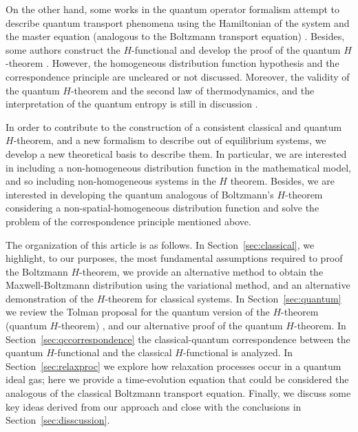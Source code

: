 On the other hand, some works in the quantum operator formalism attempt to
describe quantum transport phenomena using the Hamiltonian of the system and
the master equation (analogous to the Boltzmann transport equation)
\cite{bib:gorban2014,bib:bennaim2017,bib:tolman,bib:li2019}. %
Besides, some authors construct the $H$-functional and develop the proof of the
quantum $H$-theorem \cite{bib:silva2010,bib:deroeck2006,bib:grabert1974}.
However, the homogeneous distribution function hypothesis and the
correspondence principle are uncleared or not discussed. Moreover, the validity
of the quantum $H$-theorem and the second law of thermodynamics, and the
interpretation of the quantum entropy is still in discussion %
\cite{bib:silva2010,bib:deroeck2006,bib:grabert1974,bib:acharya2019,%
bib:kastner2017,bib:gring2012,bib:han2015,bib:das2018}.

In order to contribute to the construction of a consistent classical and
quantum $H$-theorem, and a new formalism to describe out of equilibrium
systems, we develop a new theoretical basis to describe them. In particular, we
are interested in including a non-homogeneous distribution function in the
mathematical model, and so including non-homogeneous systems in the $H$
theorem. Besides, we are interested in developing the quantum analogous of
Boltzmann's $H$-theorem considering a non-spatial-homogeneous distribution
function and solve the problem of the correspondence principle mentioned above.

The organization of this article is as follows.
In Section~\ref{sec:classical}, we highlight, to our purposes, the most
fundamental assumptions required to proof the Boltzmann $H$-theorem,
we provide an alternative method to obtain the Maxwell-Boltzmann
distribution using the variational method, and an alternative demonstration of
the $H$-theorem for classical systems. In Section~\ref{sec:quantum}
we review the Tolman proposal for the quantum
version of the $H$-theorem (quantum $H$-theorem)
,
and our alternative proof of the quantum $H$-theorem. In 
Section~\ref{sec:qccorrespondence}
the classical-quantum correspondence between the
quantum $H$-functional and the classical $H$-functional is analyzed.
In Section~\ref{sec:relaxproc} we explore how relaxation processes occur
in a quantum ideal gas; here we provide a time-evolution equation that could be
considered the analogous of the classical Boltzmann transport equation. Finally,
we discuss some key ideas derived from our approach and close with the conclusions
in Section~\ref{sec:disscussion}.

